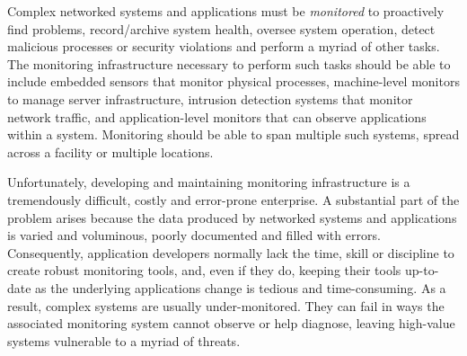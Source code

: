 

Complex networked systems and applications must be {\em monitored} to
proactively find problems, record/archive system health, oversee
system operation, detect malicious processes or security violations
and perform a myriad of other tasks.  
The monitoring infrastructure necessary to perform such tasks should
be able to include embedded sensors that monitor physical processes,
machine-level monitors to manage server infrastructure, intrusion
detection systems that monitor network traffic, and application-level
monitors that can observe applications within a system. Monitoring
should be able to span multiple such systems, spread across a facility
or multiple locations.

Unfortunately, developing and maintaining monitoring
infrastructure is a tremendously difficult, costly and error-prone
enterprise. A substantial part of the problem arises because
the data produced by networked systems and applications is
varied and voluminous, poorly documented and filled
with errors.  Consequently, application developers normally lack the time,
skill or discipline to create robust monitoring tools, and, even if they do,
keeping their tools up-to-date as the underlying applications change
is tedious and time-consuming.  As a
result, complex systems are usually under-monitored. They can
fail in ways the associated monitoring system cannot observe or help
diagnose, leaving high-value systems vulnerable to a myriad of threats.



